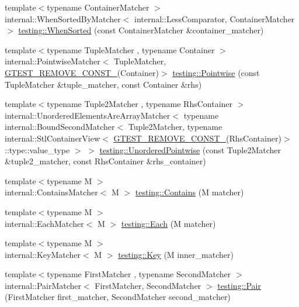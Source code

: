 \begin{DoxyCompactItemize}
\item 
{\footnotesize template$<$typename Container\+Matcher $>$ }\\internal\+::\+When\+Sorted\+By\+Matcher$<$ internal\+::\+Less\+Comparator, Container\+Matcher $>$ \hyperlink{namespacetesting_a01468e3e641c72a2efb605b4c34675ee}{testing\+::\+When\+Sorted} (const Container\+Matcher \&container\+\_\+matcher)
\item 
{\footnotesize template$<$typename Tuple\+Matcher , typename Container $>$ }\\internal\+::\+Pointwise\+Matcher$<$ Tuple\+Matcher, \hyperlink{gtest-internal_8h_a2ffec8c60510eb130af387f5ce9a756a}{G\+T\+E\+S\+T\+\_\+\+R\+E\+M\+O\+V\+E\+\_\+\+C\+O\+N\+S\+T\+\_\+}(Container)$>$ \hyperlink{namespacetesting_a51ee81f6f1723f7a7aff0429b1d76ec1}{testing\+::\+Pointwise} (const Tuple\+Matcher \&tuple\+\_\+matcher, const Container \&rhs)
\item 
{\footnotesize template$<$typename Tuple2\+Matcher , typename Rhs\+Container $>$ }\\internal\+::\+Unordered\+Elements\+Are\+Array\+Matcher$<$ typename internal\+::\+Bound\+Second\+Matcher$<$ Tuple2\+Matcher, typename internal\+::\+Stl\+Container\+View$<$ \hyperlink{gtest-internal_8h_a2ffec8c60510eb130af387f5ce9a756a}{G\+T\+E\+S\+T\+\_\+\+R\+E\+M\+O\+V\+E\+\_\+\+C\+O\+N\+S\+T\+\_\+}(Rhs\+Container)$>$\+::type\+::value\+\_\+type $>$ $>$ \hyperlink{namespacetesting_a3e800c56ae70a6d9955077a75d4971f1}{testing\+::\+Unordered\+Pointwise} (const Tuple2\+Matcher \&tuple2\+\_\+matcher, const Rhs\+Container \&rhs\+\_\+container)
\item 
{\footnotesize template$<$typename M $>$ }\\internal\+::\+Contains\+Matcher$<$ M $>$ \hyperlink{namespacetesting_a2a12af7db4752797d06c1182b2470933}{testing\+::\+Contains} (M matcher)
\item 
{\footnotesize template$<$typename M $>$ }\\internal\+::\+Each\+Matcher$<$ M $>$ \hyperlink{namespacetesting_a42743c985b1e02dc373ab7517ca1e740}{testing\+::\+Each} (M matcher)
\item 
{\footnotesize template$<$typename M $>$ }\\internal\+::\+Key\+Matcher$<$ M $>$ \hyperlink{namespacetesting_a6212e76b542f4ffd3079de59092a826a}{testing\+::\+Key} (M inner\+\_\+matcher)
\item 
{\footnotesize template$<$typename First\+Matcher , typename Second\+Matcher $>$ }\\internal\+::\+Pair\+Matcher$<$ First\+Matcher, Second\+Matcher $>$ \hyperlink{namespacetesting_ac7520de8af26d3085513eeeb68561889}{testing\+::\+Pair} (First\+Matcher first\+\_\+matcher, Second\+Matcher second\+\_\+matcher)

\end{DoxyCompactItemize}
